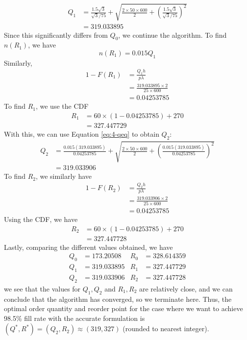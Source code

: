 \documentclass[12pt]{article}
\begin{document}
\begin{align*}
    Q_{1} &= \frac{1.5\sqrt{3}}{\sqrt{3} / 75} + \sqrt{ \frac{2 \times 50 \times 600}{2} + \left( \frac{1.5\sqrt{3}}{\sqrt{3} / 75} \right)^{2}} \\ 
    &= 319.033895
\end{align*} Since this significantly differs from $Q_{0}$, we continue the algorithm. To find $n(R_{1})$, we have \begin{equation*}
    n(R_{1}) = 0.015 Q_{1} 
\end{equation*} Similarly, \begin{align*}
    1-F(R_{1}) &= \frac{Q_{1} h}{p\lambda} \\
    &= \frac{319.033895 \times 2}{25 \times 600} \\ 
    &= 0.04253785
\end{align*} To find $R_{1}$, we use the CDF \begin{align*}
    R_{1} &= 60 \times \left( 1- 0.04253785 \right) + 270 \\ 
    &= 327.447729
\end{align*} With this, we can use Equation \ref{eq:4-qeq} to obtain $Q_{2}$: \begin{align*}
    Q_{2} &= \frac{0.015(319.033895)}{0.04253785} + \sqrt{ \frac{2 \times 50 \times 600}{2} + \left( \frac{0.015(319.033895)}{0.04253785} \right)^{2}} \\ 
    &= 319.033906
\end{align*} To find $R_{2}$, we similarly have \begin{align*}
    1 - F(R_{2}) &= \frac{Q_{2}h}{p\lambda} \\ 
    &= \frac{319.033906 \times 2}{25 \times 600} \\ 
    &= 0.04253785
\end{align*} Using the CDF, we have \begin{align*}
    R_{2} &= 60 \times \left( 1 - 0.04253785 \right) + 270 \\ 
    &= 327.447728
\end{align*} Lastly, comparing the different values obtained, we have \begin{align*}
    Q_{0} &= 173.20508 & R_{0} &= 328.614359 \\ 
    Q_{1} &= 319.033895 & R_{1} &= 327.447729 \\ 
    Q_{2} &= 319.033906 & R_{2} &= 327.447728
\end{align*} we see that the values for $Q_{1}, Q_{2}$ and $R_{1}, R_{2}$ are relatively close, and we can conclude that the algorithm has converged, so we terminate here. Thus, the optimal order quantity and reorder point for the case where we want to achieve 98.5\% fill rate with the accurate formulation is $(Q^{*}, R^{*}) = (Q_{2}, R_{2}) \approx (319, 327)$ (rounded to nearest integer). 
\end{document}
